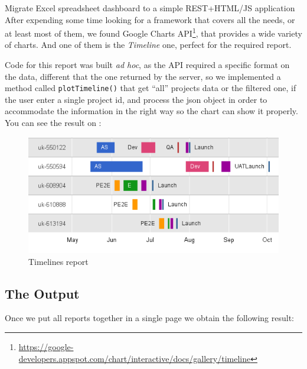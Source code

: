 \begin{part}{Migrate Excel spreadsheet dashboard to a simple REST+HTML/JS
application}
After expending some time looking for a framework that covers all the needs, or
at least most of them, we found Google Charts API\footnote{\url{https://google-developers.appspot.com/chart/interactive/docs/gallery/timeline}},
that provides a wide variety of charts. And one of them is the \emph{Timeline}
one, perfect for the required report.

Code for this report was built \emph{ad hoc}, as the API required a specific
format on the data, different that the one returned by the server, so we
implemented a method called \texttt{plotTimeline()} that get ``all'' projects data or the
filtered one, if the user enter a single project id, and process the json object
in order to accommodate the information in the right way so the chart can show
it properly. You can see the result on 
:

\begin{figure}[ht!]
	\centering
   	\includegraphics[width=1\textwidth]{./resources/report_timelines_new.png}
   	\caption{Timelines report}
   	\label{f_report_timelines_new}
\end{figure}

\subsection{The Output}
Once we put all reports together in a single page we obtain the following
result:


\end{part}
